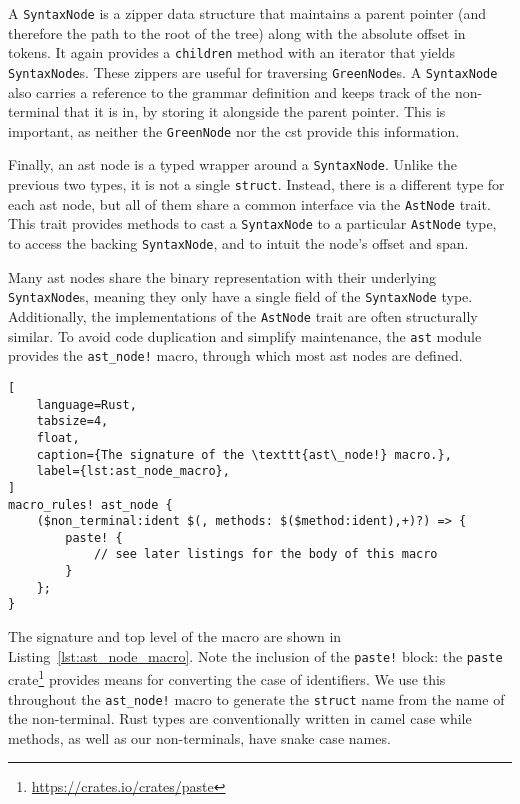 A \texttt{SyntaxNode} is a zipper data structure that maintains a parent pointer
(and therefore the path to the root of the tree) along with the absolute offset
in tokens. It again provides a \texttt{children} method with an iterator that
yields \texttt{SyntaxNode}s. These zippers are useful for traversing
\texttt{GreenNode}s. A \texttt{SyntaxNode} also carries a reference to the
grammar definition and keeps track of the non-terminal that it is in, by storing
it alongside the parent pointer. This is important, as neither the
\texttt{GreenNode} nor the \acrshort{cst} provide this information.

Finally, an \acrshort{ast} node is a typed wrapper around a \texttt{SyntaxNode}.
Unlike the previous two types, it is not a single \texttt{struct}. Instead,
there is a different type for each \acrshort{ast} node, but all of them share a
common interface via the \texttt{AstNode} trait. This trait provides methods to
cast a \texttt{SyntaxNode} to a particular \texttt{AstNode} type, to access the
backing \texttt{SyntaxNode}, and to intuit the node's offset and span.

Many \acrshort{ast} nodes share the binary representation with their underlying
\texttt{SyntaxNode}s, meaning they only have a single field of the
\texttt{SyntaxNode} type. Additionally, the implementations of the
\texttt{AstNode} trait are often structurally similar. To avoid code duplication
and simplify maintenance, the \texttt{ast} module provides the
\texttt{ast\_node!} macro, through which most \acrshort{ast} nodes are defined.

\begin{lstlisting}[
	language=Rust,
	tabsize=4,
	float,
	caption={The signature of the \texttt{ast\_node!} macro.},
	label={lst:ast_node_macro},
]
macro_rules! ast_node {
	($non_terminal:ident $(, methods: $($method:ident),+)?) => {
		paste! {
			// see later listings for the body of this macro
		}
	};
}
\end{lstlisting}

The signature and top level of the macro are shown in
Listing~\ref{lst:ast_node_macro}. Note the inclusion of the \texttt{paste!}
block: the \texttt{paste} crate\footnote{\url{https://crates.io/crates/paste}}
provides means for converting the case of identifiers. We use this throughout
the \texttt{ast\_node!} macro to generate the \texttt{struct} name from the name
of the non-terminal. Rust types are conventionally written in camel case while
methods, as well as our non-terminals, have snake case names.

